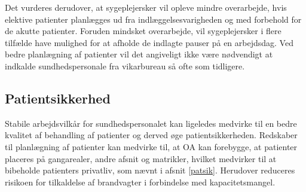 Det vurderes derudover, at sygeplejersker vil opleve mindre overarbejde, hvis elektive patienter planlægges ud fra indlæggelsesvarigheden og med forbehold for de akutte patienter. Foruden mindsket overarbejde, vil sygeplejersker i flere tilfælde have mulighed for at afholde de indlagte pauser på en arbejdsdag. Ved bedre planlægning af patienter vil det angiveligt ikke være nødvendigt at indkalde sundhedspersonale fra vikarbureau så ofte som tidligere. 


\subsection{Patientsikkerhed}
Stabile arbejdsvilkår for sundhedspersonalet kan ligeledes medvirke til en bedre kvalitet af behandling af patienter og derved øge patientsikkerheden. Redskaber til planlægning af patienter kan medvirke til, at OA kan forebygge, at patienter placeres på gangarealer, andre afsnit og matrikler, hvilket medvirker til at bibeholde patienters privatliv, som nævnt i afsnit \ref{patsik}. Herudover reduceres risikoen for tilkaldelse af brandvagter i forbindelse med kapacitetsmangel. 